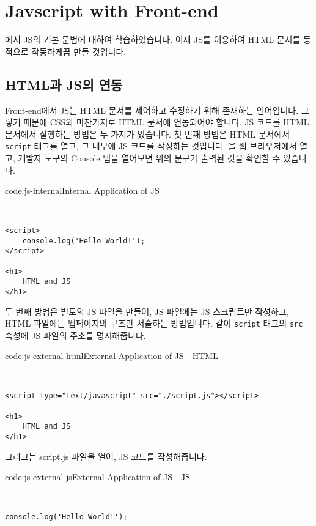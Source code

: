 \section{Javscript with Front-end} \label{sect:javascript-with-front-end}

에서 JS의 기본 문법에 대하여 학습하였습니다. 이제 JS를 이용하여 HTML 문서를 동적으로 작동하게끔 만들 것입니다. 

\subsection*{HTML과 JS의 연동}

Front-end에서 JS는 HTML 문서를 제어하고 수정하기 위해 존재하는 언어입니다. 그렇기 때문에 CSS와 마찬가지로 HTML 문서에 연동되어야 합니다. JS 코드를 HTML 문서에서 실행하는 방법은 두 가지가 있습니다. 첫 번째 방법은 HTML 문서에서 \texttt{script} 태그를 열고, 그 내부에 JS 코드를 작성하는 것입니다. 을 웹 브라우저에서 열고, 개발자 도구의 Console 탭을 열어보면 위의 문구가 출력된 것을 확인할 수 있습니다. 

\begin{codeenv}{code:js-internal}{Internal Application of JS}\begin{verbatim}


<script>
    console.log('Hello World!');
</script>

<h1>
    HTML and JS
</h1>
\end{verbatim}
\end{codeenv}

두 번째 방법은 별도의 JS 파일을 만들어, JS 파일에는 JS 스크립트만 작성하고, HTML 파일에는 웹페이지의 구조만 서술하는 방법입니다. \과 같이 \texttt{script} 태그의 \texttt{src} 속성에 JS 파일의 주소를 명시해줍니다. 

\begin{codeenv}{code:js-external-html}{External Application of JS - HTML}\begin{verbatim}


<script type="text/javascript" src="./script.js"></script>

<h1>
    HTML and JS
</h1>
\end{verbatim}
\end{codeenv}

그리고는 script.js 파일을 열어, JS 코드를 작성해줍니다. 

\begin{codeenv}{code:js-external-js}{External Application of JS - JS}\begin{verbatim}


console.log('Hello World!');
\end{verbatim}
\end{codeenv}

